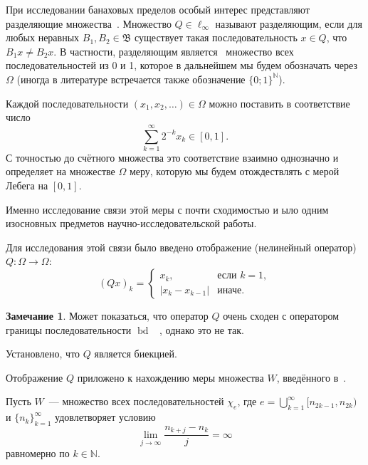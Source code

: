 \documentclass[a4paper,openbib]{report}
\theoremstyle{definition}
\newtheorem{remark}[lemma]{Замечание}
\begin{document}
При исследовании банаховых пределов особый интерес представляют разделяющие множества~\cite[\S 3]{Semenov2014geomprops}.
Множество $Q\in\ell_\infty$ называют разделяющим, если
для любых неравных $B_1, B_2\in\mathfrak{B}$ существует такая последовательность $x\in Q$,
что $B_1 x \neq B_2 x$.
В частности, разделяющим является~\cite{semenov2010characteristic} множество всех последовательностей из 0 и 1,
которое в дальнейшем мы будем обозначать через $\Omega$
(иногда в литературе встречается также обозначение $\{0;1\}^\mathbb{N}$).

Каждой последовательности $(x_1, x_2, \dots)\in \Omega$ можно поставить в соответствие число
\begin{equation}\label{eq:bijection_omega_0_1}
	\sum_{k=1}^\infty 2^{-k} x_k \in [0,1]
	.
\end{equation}
С точностью до счётного множества это соответствие взаимно однозначно и определяет на множестве $\Omega$ меру,
которую мы будем отождествлять с мерой Лебега на $[0,1]$.


Именно исследование связи этой меры с почти сходимостью и ыло одним изосновных предметов научно-исследовательской работы.

Для исследования этой связи было введено отображение (нелинейный оператор) $Q:\Omega\to\Omega$:
\begin{equation}
	(Qx)_k = \begin{cases}
		x_k, &\mbox{если~} k = 1,
		\\
		|x_k-x_{k-1}|&\mbox{иначе}.
	\end{cases}
\end{equation}

\begin{remark}
	Может показаться, что оператор $Q$ очень сходен с оператором границы последовательности $\operatorname{bd}$
	~\cite{keller1992invariant},
	однако это не так.
\end{remark}

Установлено, что $Q$ является биекцией.

Отображение $Q$ приложено к нахождению меры множества $W$,
введённого в~\cite[\S 5]{Semenov2014geomprops}.

Пусть $W$~--- множество всех последовательностей $\chi_e$, где $e =\bigcup_{k=1}^{\infty} [n_{2k-1}, n_{2k} )$
и $\{n_k \}_{k=1}^{\infty}$
удовлетворяет условию
\begin{equation}
	\label{eq:lim_j_n_kj_measure}
	\lim_{j\to\infty}\frac{n_{k+j} - n_k}{j} = \infty
\end{equation}
равномерно по $k \in \mathbb{N}$.
\end{document}
